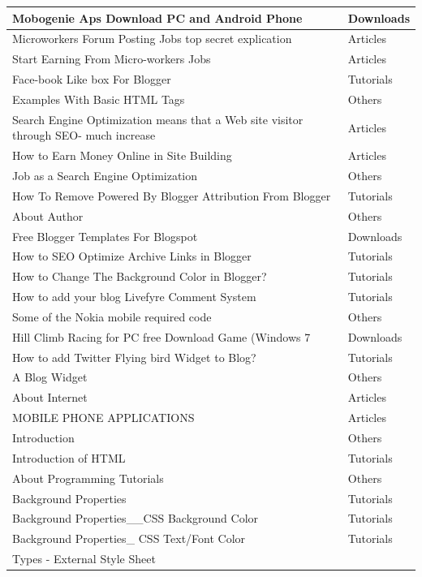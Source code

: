 \documentclass[a4paper, 11pt]{article}
\begin{document}
\begin{longtable}{ |p{12cm}|p{2cm}| }
\hline
Mobogenie Aps Download PC and Android Phone
&
Downloads \\
\hline
Microworkers Forum Posting Jobs top secret explication
&
Articles \\
\hline
Start Earning From Micro-workers Jobs
&
Articles \\
\hline
Face-book Like box  For Blogger
&
Tutorials \\
\hline
Examples With Basic HTML  Tags
&
Others \\
\hline
Search Engine Optimization means that a Web site visitor through SEO- much increase
&
Articles \\
\hline
How to Earn Money Online in Site Building
&
Articles \\
\hline
Job as a Search Engine Optimization
&
Others \\
\hline
How To Remove Powered By Blogger Attribution From Blogger
&
Tutorials \\
\hline
About Author
&
Others \\
\hline
Free Blogger Templates For Blogspot
&
Downloads \\
\hline
How to SEO Optimize Archive Links in Blogger
&
Tutorials \\
\hline
How to Change The Background Color in Blogger?
&
Tutorials \\
\hline
How to add your blog Livefyre Comment System
&
Tutorials \\
\hline
Some of the Nokia  mobile  required code
&
Others \\
\hline
Hill Climb Racing for PC free Download Game (Windows 7
&
Downloads \\
\hline
How to add Twitter Flying bird Widget to Blog?
&
Tutorials \\
\hline
A Blog Widget
&
Others \\
\hline
About Internet
&
Articles \\
\hline
MOBILE PHONE APPLICATIONS
&
Articles \\
\hline
Introduction
&
Others \\
\hline
Introduction of HTML
&
Tutorials \\
\hline
About Programming Tutorials
&
Others \\
\hline
Background Properties
&
Tutorials \\
\hline
Background Properties\_\_CSS Background Color
&
Tutorials \\
\hline
Background Properties\_ CSS Text/Font Color
&
Tutorials \\
\hline
Types - External Style Sheet
&

\end{longtable}
\end{document}
